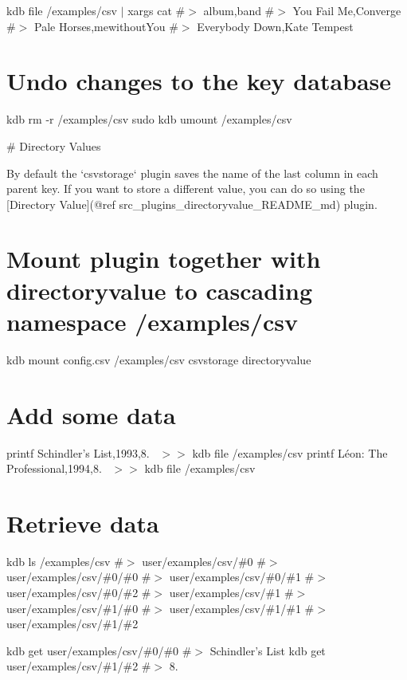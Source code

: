 kdb file /examples/csv $\vert$ xargs cat \#$>$ album,band \#$>$ You Fail Me,Converge \#$>$ Pale Horses,mewithout\+You \#$>$ Everybody Down,Kate Tempest

\section*{Undo changes to the key database}

kdb rm -\/r /examples/csv sudo kdb umount /examples/csv 
\begin{DoxyCode}
# Directory Values

By default the `csvstorage` plugin saves the name of the last column in each parent key. If you want to
       store a different value, you can do
so using the [Directory Value](@ref src\_plugins\_directoryvalue\_README\_md) plugin.
\end{DoxyCode}
 \section*{Mount plugin together with {\ttfamily directoryvalue} to cascading namespace {\ttfamily /examples/csv}}

kdb mount config.\+csv /examples/csv csvstorage directoryvalue

\section*{Add some data}

printf \textquotesingle{}Schindler’s List,1993,8.~\newline
\textquotesingle{} $>$$>$ {\ttfamily kdb file /examples/csv} printf \textquotesingle{}Léon\+: The Professional,1994,8.~\newline
\textquotesingle{} $>$$>$ {\ttfamily kdb file /examples/csv}

\section*{Retrieve data}

kdb ls /examples/csv \#$>$ user/examples/csv/\#0 \#$>$ user/examples/csv/\#0/\#0 \#$>$ user/examples/csv/\#0/\#1 \#$>$ user/examples/csv/\#0/\#2 \#$>$ user/examples/csv/\#1 \#$>$ user/examples/csv/\#1/\#0 \#$>$ user/examples/csv/\#1/\#1 \#$>$ user/examples/csv/\#1/\#2

kdb get user/examples/csv/\#0/\#0 \#$>$ Schindler’s List kdb get user/examples/csv/\#1/\#2 \#$>$ 8.

